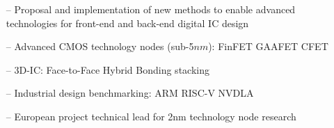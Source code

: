 \documentclass[10pt,a4paper,fancychapters]{altacv}
\begin{document}
\medskip


\medskip






\begin{itemize}
    \setlength{\itemindent}{0.5em}
    \item[--] \small{Proposal and implementation of new methods to enable advanced technologies for front-end and back-end digital IC design}
    \item[--] \small{Advanced CMOS technology nodes (sub-5$nm$): FinFET \textbullet\hspace{0.1em} GAAFET \textbullet\hspace{0.1em} CFET}
    \item[--] \small{3D-IC: Face-to-Face Hybrid Bonding stacking}
    \item[--] \small{Industrial design benchmarking: ARM \textbullet\hspace{0.1em} RISC-V \textbullet\hspace{0.1em} NVDLA}
    \item[--] \small{European project technical lead for 2nm technology node research}
\end{itemize}
\end{document}
